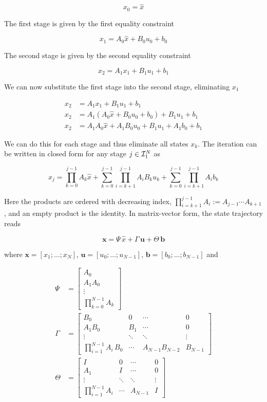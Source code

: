 \[
x_0 = \hat{x}
\]

The first stage is given by the first equality constraint

\[
x_1 = A_0 \hat{x} + B_0 u_0 + b_0
\]

The second stage is given by the second equality constraint

\[
x_2 = A_1 x_1 + B_1 u_1 + b_1
\]

We can now substitute the first stage into the second stage, eliminating $x_1$

\begin{align*}
    x_2 &= A_1 x_1 + B_1 u_1 + b_1 \\
    x_2 &= A_1 \left( A_0 \hat{x} + B_0 u_0 + b_0 \right) + B_1 u_1 + b_1 \\
    x_2 &= A_1 A_0 \hat{x} + A_1 B_0 u_0 + B_1 u_1 + A_1 b_0 + b_1
\end{align*}

We can do this for each stage and thus eliminate all states $x_k$.
The iteration can be written in closed form for any stage $j \in \mathcal{I}_{1}^{N}$ as

\[
x_j = \prod_{k=0}^{j-1} A_k \hat{x} + \sum_{k=0}^{j-1} \prod_{i=k+1}^{j-1} A_i B_k u_k + \sum_{k=0}^{j-1} \prod_{i=k+1}^{j-1} A_i b_k
\]

Here the products are ordered with decreasing index, $\prod_{i=k+1}^{j-1} A_i := A_{j-1} \cdots A_{k+1}$, and an empty product is the identity.
In matrix-vector form, the state trajectory reads

\[
\mathbf{x} = \Psi\,\hat{x} + \Gamma\,\mathbf{u} + \Theta\,\mathbf{b}
\]

where $\mathbf{x} = [x_1; \dots; x_N]$, $\mathbf{u} = [u_0; \dots; u_{N-1}]$, $\mathbf{b} = [b_0; \dots; b_{N-1}]$ and

\begin{align*}
    \Psi &= \begin{bmatrix} 
        A_0 \\ 
        A_1 A_0 \\ 
        \vdots \\ 
        \prod_{k=0}^{N-1} A_k 
    \end{bmatrix} \\
    \Gamma &= \begin{bmatrix} 
        B_0 & 0 & \cdots & 0 \\ 
        A_1 B_0 & B_1 & \cdots & 0 \\ 
        \vdots & \ddots & \ddots & \vdots \\ 
        \prod_{i=1}^{N-1} A_i\, B_0 & \cdots & A_{N-1} B_{N-2} & B_{N-1} 
    \end{bmatrix} \\
    \Theta &= \begin{bmatrix} 
        I & 0 & \cdots & 0 \\ 
        A_1 & I & \cdots & 0 \\ 
        \vdots & \ddots & \ddots & \vdots \\ 
        \prod_{i=1}^{N-1} A_i & \cdots & A_{N-1} & I 
    \end{bmatrix}
\end{align*}


